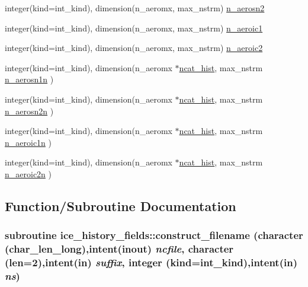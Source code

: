 \begin{DoxyCompactItemize}
integer(kind=int\_\-kind), dimension(n\_\-aeromx, max\_\-nstrm) \hyperlink{namespaceice__history__fields_a4c7ca26f7fe5c329bea1bd5e4a301eed}{n\_\-aerosn2}
\item 
integer(kind=int\_\-kind), dimension(n\_\-aeromx, max\_\-nstrm) \hyperlink{namespaceice__history__fields_ad6f36fcab3ebeaa42f44b63a39474c4a}{n\_\-aeroic1}
\item 
integer(kind=int\_\-kind), dimension(n\_\-aeromx, max\_\-nstrm) \hyperlink{namespaceice__history__fields_ac48a9741b1cf192db287c558cb4fadb4}{n\_\-aeroic2}
\item 
integer(kind=int\_\-kind), dimension(n\_\-aeromx $\ast$\hyperlink{namespaceice__history__fields_ad4675933f882f223e8ec25c5c938b13e}{ncat\_\-hist}, max\_\-nstrm \hyperlink{namespaceice__history__fields_ac520de6cb3b77c13aca8ca21845734f2}{n\_\-aerosn1n} )
\item 
integer(kind=int\_\-kind), dimension(n\_\-aeromx $\ast$\hyperlink{namespaceice__history__fields_ad4675933f882f223e8ec25c5c938b13e}{ncat\_\-hist}, max\_\-nstrm \hyperlink{namespaceice__history__fields_a418c55bcea4b5e65a38aa22c871db56f}{n\_\-aerosn2n} )
\item 
integer(kind=int\_\-kind), dimension(n\_\-aeromx $\ast$\hyperlink{namespaceice__history__fields_ad4675933f882f223e8ec25c5c938b13e}{ncat\_\-hist}, max\_\-nstrm \hyperlink{namespaceice__history__fields_aa77dba4dfa1d45de1f64c6ae28e7b370}{n\_\-aeroic1n} )
\item 
integer(kind=int\_\-kind), dimension(n\_\-aeromx $\ast$\hyperlink{namespaceice__history__fields_ad4675933f882f223e8ec25c5c938b13e}{ncat\_\-hist}, max\_\-nstrm \hyperlink{namespaceice__history__fields_a96d44e16cfbb40e84bad71a4f084c9a6}{n\_\-aeroic2n} )
\end{DoxyCompactItemize}


\subsection{Function/Subroutine Documentation}
\hypertarget{namespaceice__history__fields_a64420e9d3c2971300dd20fc51259f7e8}{
\subsubsection[{construct\_\-filename}]{\setlength{\rightskip}{0pt plus 5cm}subroutine ice\_\-history\_\-fields::construct\_\-filename (character (char\_\-len\_\-long),intent(inout) {\em ncfile}, \/  character (len=2),intent(in) {\em suffix}, \/  integer (kind=int\_\-kind),intent(in) {\em ns})}}
\label{namespaceice__history__fields_a64420e9d3c2971300dd20fc51259f7e8}


